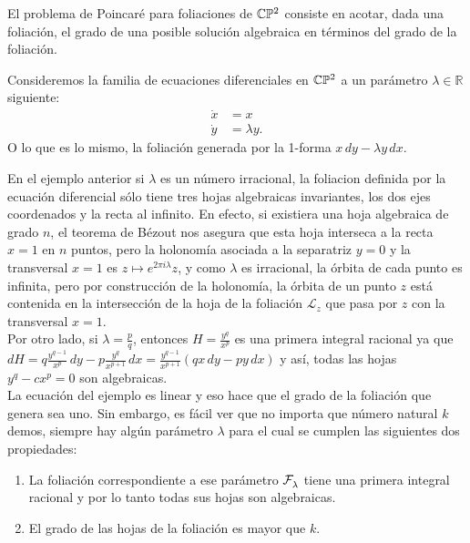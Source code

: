 El problema de Poincaré para foliaciones de $\mathbb{C}\mathbb{P}^2$ consiste en acotar, dada una foliación, el grado de una posible solución algebraica en términos del grado de la foliación.
 
\begin{Ejemplo}
\label{Ej:Intro}
Consideremos la familia de ecuaciones diferenciales en $\mathbb{C}\mathbb{P}^2$ a un parámetro $\lambda\in\mathbb{R}$ siguiente:
\begin{align*}
\dot{x} & = x \\
\dot{y} & = \lambda y.
\end{align*}
O lo que es lo mismo, la foliación generada por la 1-forma $x\,dy - \lambda y\,dx$.
\end{Ejemplo}

En el ejemplo anterior si $\lambda$ es un número irracional, la foliacion definida por la ecuación diferencial sólo tiene tres hojas algebraicas invariantes, los dos ejes coordenados y la recta al infinito. En efecto, si existiera una hoja algebraica de grado $n$, el teorema de Bézout nos asegura que esta hoja interseca a la recta $x=1$ en $n$ puntos, pero la holonomía asociada a la separatriz $y=0$ y la transversal $x=1$ es $z\mapsto e^{2\pi i\lambda}z$,  y como $\lambda$ es irracional, la órbita de cada punto es infinita, pero por construcción de la holonomía, la órbita de un punto $z$ está contenida en la intersección de la hoja de la foliación $\mathcal{L}_z$ que pasa por $z$ con la transversal $x=1$. 
\\

Por otro lado, si $\lambda = \tfrac{p}{q}$, entonces $H = \tfrac{y^q}{x^p}$ es una primera integral racional ya que $dH = q\tfrac{y^{q-1}}{x^p}\,dy - p\tfrac{y^q}{x^{p+1}}\,dx = \tfrac{y^{q-1}}{x^{p+1}}(qx\,dy -py\,dx)$ y así, todas las hojas $y^q-cx^p=0$ son algebraicas.
\\

La ecuación del ejemplo es linear y eso hace que el grado de la foliación que genera sea uno. Sin embargo, es fácil ver que no importa que número natural $k$ demos, siempre hay algún parámetro $\lambda$ para el cual se cumplen las siguientes dos propiedades:

\begin{enumerate}
\item La foliación correspondiente a ese parámetro $\mathcal{F}^{\ }_{\lambda}$ tiene una primera integral racional y por lo tanto todas sus hojas son algebraicas.

\item El grado de las hojas de la foliación es mayor que $k$.
\end{enumerate}  

